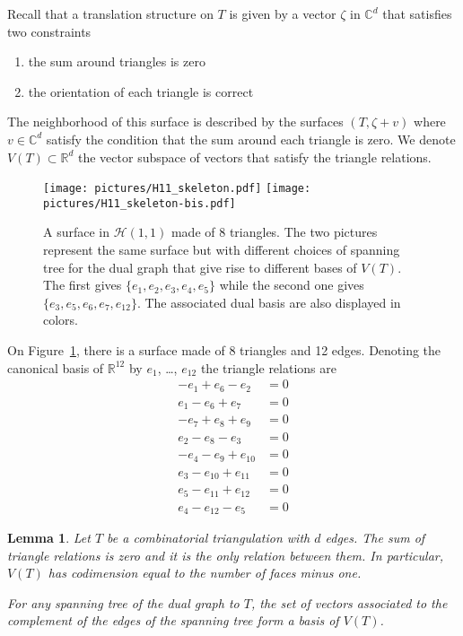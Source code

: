 \documentclass[a4paper,12pt]{article}
\def\bC{\mathbb{C}}
\def\bR{\mathbb{R}}
\def\cH{\mathcal{H}}
\newtheorem{lemma}[definition]{Lemma}
\begin{document}
Recall that a translation structure on $T$ is given by a vector $\zeta$
in $\bC^d$ that satisfies two constraints
\begin{enumerate}
\item the sum around triangles is zero
\item the orientation of each triangle is correct
\end{enumerate}
The neighborhood of this surface is described by the surfaces $(T, \zeta + v)$
where $v \in \bC^d$ satisfy the condition that the sum around each triangle is
zero. We denote $V(T) \subset \bR^d$ the vector subspace of vectors that
satisfy the triangle relations.

\begin{figure}[!ht]
\begin{center}%
\texttt{[image: pictures/H11\_skeleton.pdf]}%
\hspace{1cm}%
\texttt{[image: pictures/H11\_skeleton-bis.pdf]}%
\end{center}
\caption{A surface in $\cH(1,1)$ made of 8 triangles. The two pictures represent the
same surface but with different choices of spanning tree for the dual graph that
give rise to different bases of $V(T)$. The first gives $\{e_1, e_2, e_3, e_4, e_5\}$
while the second one gives $\{e_3, e_5, e_6, e_7, e_{12}\}$. The associated dual basis
are also displayed in colors.}
\label{fig:H11skeleton}
\end{figure}

On Figure~\ref{fig:H11skeleton}, there is a surface made of 8 triangles and
12 edges. Denoting the canonical basis of $\bR^{12}$ by $e_1$, \ldots, $e_{12}$
the triangle relations are
\begin{align*}
-e_1 + e_6 - e_2 &= 0 \\
e_1 - e_6 + e_7 &= 0 \\
-e_7 + e_8 + e_9 &= 0 \\
e_2 - e_8 - e_3 &= 0 \\
-e_4 - e_9 + e_{10} &= 0 \\
e_3 - e_{10} + e_{11} &= 0 \\
e_5 - e_{11} + e_{12} &= 0 \\
e_4 - e_{12} - e_{5} &= 0
\end{align*}

\begin{lemma}
Let $T$ be a combinatorial triangulation with $d$ edges. The sum of triangle
relations is zero and it is the only relation between them. In particular,
$V(T)$ has codimension equal to the number of faces minus one.

For any spanning tree of the dual graph to $T$, the set of vectors associated to the
complement of the edges of the spanning tree form a basis of $V(T)$.
\end{lemma}
\end{document}
